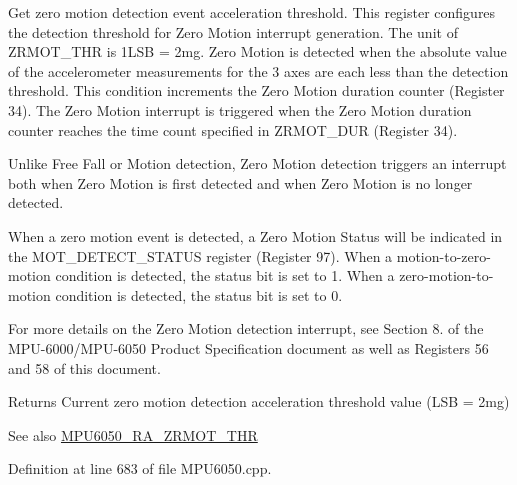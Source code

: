 Get zero motion detection event acceleration threshold. This register configures the detection threshold for Zero Motion interrupt generation. The unit of Z\+R\+M\+O\+T\+\_\+\+T\+HR is 1L\+SB = 2mg. Zero Motion is detected when the absolute value of the accelerometer measurements for the 3 axes are each less than the detection threshold. This condition increments the Zero Motion duration counter (Register 34). The Zero Motion interrupt is triggered when the Zero Motion duration counter reaches the time count specified in Z\+R\+M\+O\+T\+\_\+\+D\+UR (Register 34).

Unlike Free Fall or Motion detection, Zero Motion detection triggers an interrupt both when Zero Motion is first detected and when Zero Motion is no longer detected.

When a zero motion event is detected, a Zero Motion Status will be indicated in the M\+O\+T\+\_\+\+D\+E\+T\+E\+C\+T\+\_\+\+S\+T\+A\+T\+US register (Register 97). When a motion-\/to-\/zero-\/motion condition is detected, the status bit is set to 1. When a zero-\/motion-\/to-\/ motion condition is detected, the status bit is set to 0.

For more details on the Zero Motion detection interrupt, see Section 8. of the M\+P\+U-\/6000/\+M\+P\+U-\/6050 Product Specification document as well as Registers 56 and 58 of this document.

\begin{DoxyReturn}{Returns}
Current zero motion detection acceleration threshold value (L\+SB = 2mg) 
\end{DoxyReturn}
\begin{DoxySeeAlso}{See also}
\mbox{\hyperlink{MPU6050_8h_a866eb43544165dc8c777d82bab9860e6}{M\+P\+U6050\+\_\+\+R\+A\+\_\+\+Z\+R\+M\+O\+T\+\_\+\+T\+HR}} 
\end{DoxySeeAlso}


Definition at line 683 of file M\+P\+U6050.\+cpp.


\begin{DoxyCode}{0}

\end{DoxyCode}
\mbox{\label{classMPU6050_a13c980e62e6e7774299fea1c827b6e7a}} 
